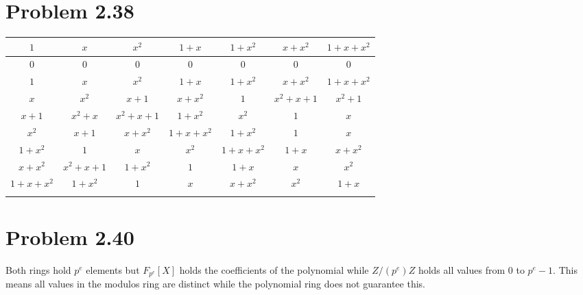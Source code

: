 \documentclass[10pt]{amsart}
\begin{document}
\section*{\large \textbf{Problem 2.38}}
\begin{addmargin}{5pt}    
\begin{center}
 \begin{tabular}{||c c c c c c c ||} 
 \hline
$1$ & $x$ & $x^2$ & $1 + x$ & $1 + x^2$ & $x + x^2$ & 
    $1 + x + x^2$ \\ [0.5ex] 
 \hline\hline
  0 & 0 & 0 & 0 & 0 & 0 & 0 \\ 
 \hline
 $1$ & $x$ & $x^2$ & $1 + x$ & $1 + x^2$ & $x + x^2$ & $1 + x + x^2$  \\ 
 \hline
 $x$   & $x^2$ & $x + 1$ & $x + x^2$ & $1$ & $x^2 + x + 1$  & $x^2 + 1$\\
\hline
 $x + 1$   & $x^2 + x$ & $x^2 + x + 1$ & $1 + x^2$ & $x^2$  & $1$  & $x$\\
 \hline
 $x^2$ & $x+1$ & $x + x^2$ & $1 + x + x^2$ & $1 + x^2$ & $1$ & $x$ \\
 \hline
 $1 + x^2$ & $1$ & $x$  & $x^2$ & $ 1 + x + x^2 $ & $1 + x$ & $x + x^2$  \\ [0.5ex] 
 \hline
$x + x^2$ & $x^2 + x + 1$ & $1 + x^2$ & $1$ & $1 + x$ & $x$ & $x^2$  \\ 
 \hline
 $1 + x + x^2$ & $1 + x^2$ & $1$  & $x$ & $x + x^2$  & $x^2$  & $1 + x$  \\ [0.5ex] 
\hline \\
\end{tabular}
\end{center}
\end{addmargin}


\section*{\large \textbf{Problem 2.40}}
\begin{addmargin}{5pt}    
Both rings hold $p^e$ elements but $F_{p^e}[X]$ holds the coefficients of 
the polynomial while $Z/(p^e)Z$ holds all values from $0$ to $p^e - 1$. This 
means all values in the modulos ring are distinct while the polynomial ring 
does not guarantee this.  
\end{addmargin}
\end{document}
